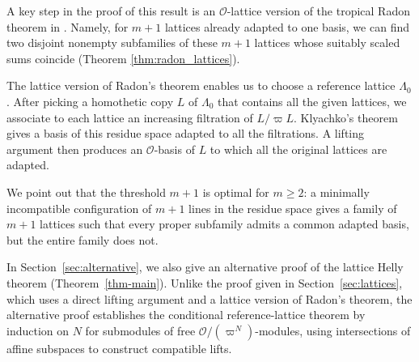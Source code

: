 \documentclass[12pt]{amsart}
\theoremstyle{definition}
\theoremstyle{remark}
\begin{document}
A key step in the proof of this result is an $\mathcal{O}$-lattice version of the tropical Radon theorem in \cite[Section~3]{GM}. Namely, for $m+1$ lattices already adapted to one basis, we can find two disjoint nonempty subfamilies of these $m+1$ lattices whose suitably scaled sums coincide (Theorem \ref{thm:radon_lattices}).

The lattice version of Radon's theorem enables us to choose a
reference lattice $\Lambda_0$. After picking a homothetic copy
$L$ of $\Lambda_0$ that contains all the given lattices, we associate to each lattice an increasing filtration of $L/\varpi L$. Klyachko's theorem gives a basis of this residue space adapted to all the filtrations. A lifting argument then produces an $\mathcal O$-basis of $L$ to which all the original lattices are adapted.



We point out that the threshold $m+1$ is optimal for $m\geq2$: a minimally incompatible configuration of $m+1$ lines in the residue space gives a family of $m+1$ lattices such that every proper subfamily admits a common adapted basis, but the entire family does not.

In Section~\ref{sec:alternative}, we also give an alternative proof of the lattice Helly theorem (Theorem~\ref{thm-main}). Unlike the proof given in Section~\ref{sec:lattices}, which uses a direct lifting argument and a lattice version of Radon's theorem, the alternative proof establishes the conditional reference-lattice theorem by induction on $N$ for submodules of free $\mathcal O/(\varpi^N)$-modules, using intersections of affine subspaces to construct compatible lifts. %
\end{document}
